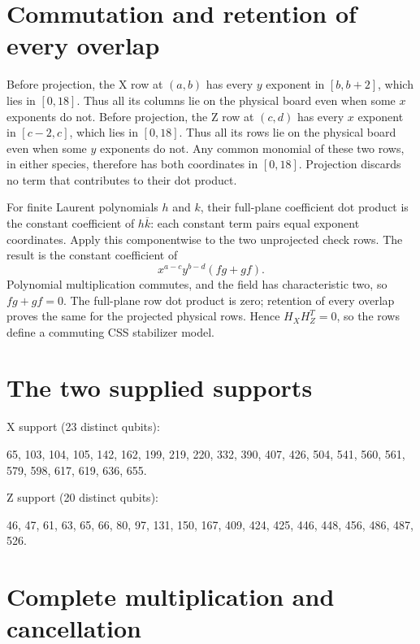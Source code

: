 \documentclass{article}
\begin{document}
\section{Commutation and retention of every overlap}\label{sec:commutation}

Before projection, the X row at \((a,b)\) has every \(y\) exponent in \([b,b+2]\),
which lies in \([0,18]\). Thus all its columns lie on the physical board even
when some \(x\) exponents do not. Before projection, the Z row at \((c,d)\) has
every \(x\) exponent in \([c-2,c]\), which lies in \([0,18]\). Thus all its rows lie
on the physical board even when some \(y\) exponents do not. Any common
monomial of these two rows, in either species, therefore has both coordinates
in \([0,18]\). Projection discards no term that contributes to their dot product.

For finite Laurent polynomials \(h\) and \(k\), their full-plane coefficient dot
product is the constant coefficient of \(h\overline{k}\): each constant term pairs
equal exponent coordinates. Apply this componentwise to the two unprojected
check rows. The result is the constant coefficient of
\begin{equation}
  x^{a-c} y^{b-d} (fg + gf).
\end{equation}
Polynomial multiplication commutes, and the field has characteristic two,
so \(fg + gf = 0\). The full-plane row dot product is zero; retention of every
overlap proves the same for the projected physical rows. Hence
\(H_X H_Z^T = 0\), so the rows define a commuting CSS stabilizer model.

\section{The two supplied supports}\label{sec:supports}

X support (23 distinct qubits):

65, 103, 104, 105, 142, 162, 199, 219, 220, 332, 390, 407, 426, 504, 541, 560, 561, 579, 598, 617, 619, 636, 655.

Z support (20 distinct qubits):

46, 47, 61, 63, 65, 66, 80, 97, 131, 150, 167, 409, 424, 425, 446, 448, 456, 486, 487, 526.

\section{Complete multiplication and cancellation}\label{sec:multiplication}
\end{document}
